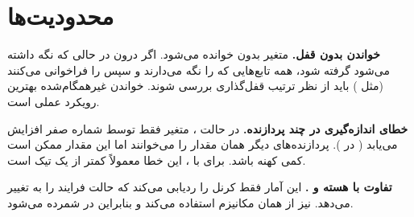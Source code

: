 \documentclass[code]{amznotes-fa}
\begin{document}
\chapter{محدودیت‌ها}

\begin{notebox}
\textbf{خواندن  بدون قفل.} متغیر  بدون  خوانده می‌شود. اگر  درون  در حالی که  نگه داشته می‌شود گرفته شود، همه تابع‌هایی که  را نگه می‌دارند و سپس  را فراخوانی می‌کنند (مثل ) باید از نظر ترتیب قفل‌گذاری بررسی شوند. خواندن غیرهمگام‌شده بهترین رویکرد عملی است.
\end{notebox}

\begin{notebox}
\textbf{خطای اندازه‌گیری در چند پردازنده.} در حالت ، متغیر  فقط توسط  شماره صفر افزایش می‌یابد ( در ). پردازنده‌های دیگر همان مقدار را می‌خوانند اما این مقدار ممکن است کمی کهنه باشد. برای  با ، این خطا معمولاً کمتر از یک تیک است.
\end{notebox}

\begin{notebox}
\textbf{تفاوت با  هسته و .} این آمار فقط  کرنل را ردیابی می‌کند که حالت فرایند را به  تغییر می‌دهد.  نیز از همان مکانیزم استفاده می‌کند و بنابراین در  شمرده می‌شود.
\end{notebox}
\end{document}
